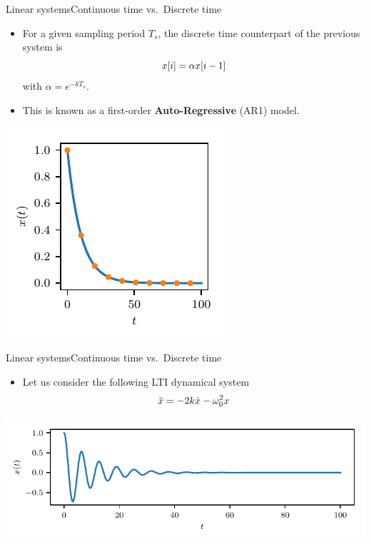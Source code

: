 \documentclass[usenames,dvipsnames,svgnames,10pt,aspectratio=169]{beamer}
\begin{document}
\begin{frame}[t, c]{Linear systems}{Continuous time vs.\ Discrete time}
	\begin{minipage}{.48\textwidth}
		\begin{itemize}
			\item For a given sampling period $T_s$, the discrete time counterpart of the previous system is
			\begin{equation}
				\displaystyle x[i] = \alpha x[i-1]
				\notag
			\end{equation}
			with $\alpha = e^{-k T_s}$.

			\bigskip

			\item This is known as a first-order \alert{\textbf{Auto-Regressive}} (AR1) model.
			\end{itemize}
		\vspace{1.25cm}
	\end{minipage}%
	\hfill
	\begin{minipage}{.48\textwidth}
		\centering
		\includegraphics[width=.75\textwidth]{first_order_system_bis}
	\end{minipage}
\end{frame}

\begin{frame}[t, c]{Linear systems}{Continuous time vs.\ Discrete time}
	\centering
	\begin{itemize}
		\item Let us consider the following LTI dynamical system
		\begin{equation}
			\ddot{x} = -2k \dot{x} - \omega_0^2 x
			\notag
		\end{equation}
	\end{itemize}
	\includegraphics[width=.75\textwidth]{second_order_system}
\end{frame}
\end{document}
